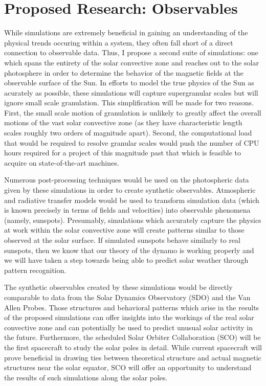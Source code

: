 \documentclass[aasms,12pt]{article}
\begin{document}
\section{Proposed Research: Observables}
While simulations are extremely beneficial in gaining an understanding of the
physical trends occuring within a system, they often fall short of a direct
connection to observable data.  Thus, I propose a second suite of simulations:
one which spans the entirety of the solar convective zone and reaches out to
the solar photosphere in order to determine the behavior of the magnetic fields
at the observable surface of the Sun.  In efforts to model the true physics of
the Sun as acurately as possible, these simulations will capture supergranular 
scales but will ignore small scale granulation.  This simplification will be
made for two reasons.  First, the small scale motion of granulation is unlikely
to greatly affect the overall motions of the vast solar convective zone (as
they have characteristic length scales roughly two orders of magnitude apart).
Second, the computational load that would be required to resolve granular scales
would push the number of CPU hours required for a project of this magnitude
past that which is feasible to acquire on state-of-the-art machines.

Numerous post-processing techniques would be used on the photospheric data 
given by these simulations in order to create synthetic observables.
Atmospheric and radiative transfer models would be used to transform simulation
data (which is known precisely in terms of fields and velocities) into
observable phenomena (namely, sunspots). 
Presumably, simulations
which accurately capture the physics at work within the solar convective zone
will create patterns similar to those observed at the solar surface.  If
simulated sunspots behave similarly to real sunspots, then we know that our
theory of the dynamo is working properly and we will have taken a step towards
being able to predict solar weather through pattern recognition.

The synthetic observables created by these simulations would be directly
comparable to data from the Solar Dynamics Observatory (SDO) and the Van Allen
Probes.  Those structures and behavioral patterns which arise in the results
of the proposed simulations can offer insights into the workings of the real
solar convective zone and can potentially be used to predict unusual solar
activity in the future.  Furthermore, the scheduled Solar Orbiter Collaboration
(SCO) will be the first spacecraft to study the solar poles in detail.  While
current spacecraft will prove beneficial in drawing ties between theoretical
structure and actual magnetic structures near the solar equator, SCO will offer
an opportunity to understand the results of such simulations along the solar
poles. 
\end{document}
